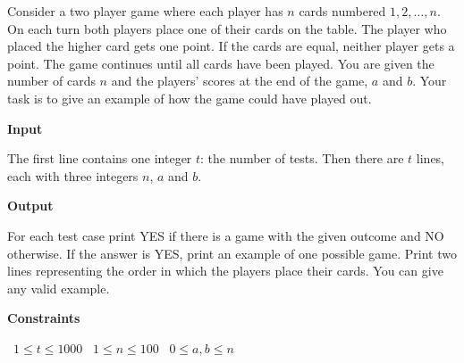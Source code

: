 Consider a two player game where each player has $n$ cards numbered $1,2,\dots,n$. On each turn both players place one of their cards on the table. The player who placed the higher card gets one point. If the cards are equal, neither player gets a point. The game continues until all cards have been played.
You are given the number of cards $n$ and the players' scores at the end of the game, $a$ and $b$. Your task is to give an example of how the game could have played out.

\vspace{0.3cm}\noindent\textbf{Input}

The first line contains one integer $t$: the number of tests.
Then there are $t$ lines, each with three integers $n$, $a$ and $b$.

\vspace{0.3cm}\noindent\textbf{Output}

For each test case print YES if there is a game with the given outcome and NO otherwise.
If the answer is YES, print an example of one possible game. Print two lines representing the order in which the players place their cards. You can give any valid example.

\vspace{0.3cm}\noindent\textbf{Constraints}

\textbullet\ $1 \le t \le 1000$
\textbullet\ $1 \le n \le 100$
\textbullet\ $0 \le a,b \le n$